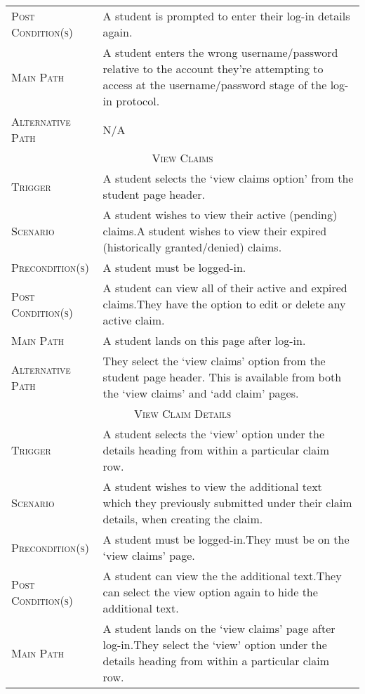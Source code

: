 \documentclass[11pt, english]{article}
\begin{document}
\begin{center}
\begin{longtable}{p{3cm}|p{9cm}}
		\textsc{Post Condition(s)} & A student is prompted to enter their log-in details again.\\
		\textsc{Main Path} & A student enters the wrong username/password relative to the account they're attempting to access at the username/password stage of the log-in protocol.\\
		\textsc{Alternative Path} & N/A\\
		\hline
		\multicolumn{2}{c}{\textsc{View Claims}}\\
		\hline
		\textsc{Trigger} & A student selects the `view claims option' from the student page header.\\
		\textsc{Scenario} & A student wishes to view their active (pending) claims.\newline A student wishes to view their expired (historically granted/denied) claims.\\
		\textsc{Precondition(s)} & A student must be logged-in.\\
		\textsc{Post Condition(s)} & A student can view all of their active and expired claims.\newline They have the option to edit or delete any active claim.\\
		\textsc{Main Path} & A student lands on this page after log-in.\\
		\textsc{Alternative Path} & They select the `view claims' option from the student page header. This is available from both the `view claims' and `add claim' pages.\\
		\hline
		\multicolumn{2}{c}{\textsc{View Claim Details}}\\
		\hline
		\textsc{Trigger} & A student selects the `view' option under the details heading from within a particular claim row.\\
		\textsc{Scenario} & A student wishes to view the additional text which they previously submitted under their claim details, when creating the claim.\\
		\textsc{Precondition(s)} & A student must be logged-in.\newline They must be on the `view claims' page.\\
		\textsc{Post Condition(s)} & A student can view the the additional text.\newline They can select the view option again to hide the additional text.\\
		\textsc{Main Path} & A student lands on the `view claims' page after log-in.\newline They select the `view' option under the details heading from within a particular claim row.\\

\end{longtable}
\end{center}
\end{document}

